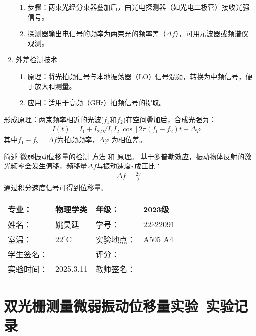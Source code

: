 \documentclass[dvipsnames, svgnames,a4paper,11pt]{article}
\newcommand{\exname}{双光栅测量微弱振动位移量实验}%
\begin{document}
\begin{question}
\begin{enumerate}
        \begin{enumerate}
            \item 步骤：两束光经分束器叠加后，由光电探测器（如光电二极管）接收光强信号。
            \item 探测器输出电信号的频率为两束光的频率差（$\Delta f $），可用示波器或频谱仪观测。
        \end{enumerate}
        \item 外差检测技术
        \begin{enumerate}
            \item 原理：将光拍频信号与本地振荡器（LO）信号混频，转换为中频信号，便于放大和测量。
            \item 应用：适用于高频（GHz）拍频信号的提取。
        \end{enumerate}
    \end{enumerate}
    形成原理：两束频率相近的光波($f_1$和$f_2$)在空间叠加后，合成光强为：
    \begin{align*}
        I(t)=I_1+I_22\sqrt{I_1I_2}\cos[2\pi(f_1-f_2)t+\Delta \varphi]
    \end{align*}
    其中$f_1-f_2=\Delta f$为拍频频率，$\Delta \varphi$ 为相位差。   
\end{question}

\begin{question}
    简述 微弱振动位移量的检测 方法 和 原理。
    \tcblower
    基于多普勒效应，振动物体反射的激光频率会发生偏移，频移量$\Delta f$与振动速度$v$成正比：
    \begin{align*}
        \Delta f=\frac{2v}{\lambda}
    \end{align*}
    通过积分速度信号可得到位移量。
\end{question}
\clearpage
{}
\begin{table}
	\renewcommand\arraystretch{1.7}
	\centering
	\begin{tabularx}{\textwidth}{|X|X|X|X|}
	\hline
	专业：& 物理学类 &年级：& 2023级 \\
	\hline
	姓名： &姚昊廷& 学号：&22322091  \\
	\hline
	室温：&$22^\circ$C&实验地点：&A505  A4\\
	\hline
	学生签名：& & 评分： &\\
	\hline
	实验时间：& 2025.3.11& 教师签名：&\\
	\hline
	\end{tabularx}
\end{table}
\section{\exname\ \textbf{实验记录}}
\end{document}
